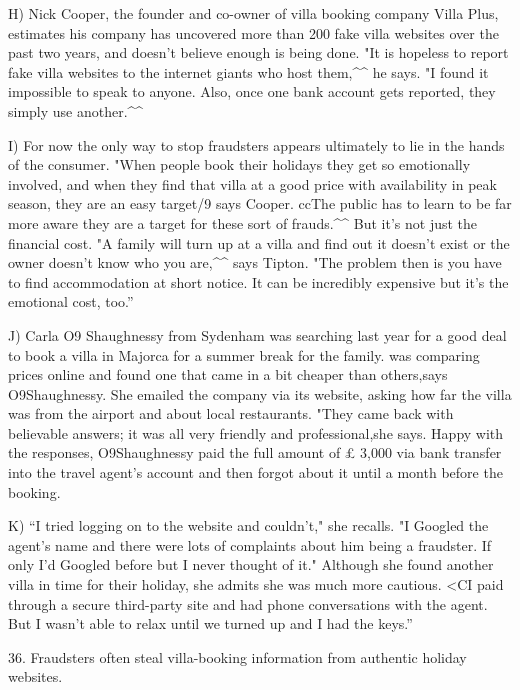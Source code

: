 \documentclass[UTF8,11pt]{ctexart}
\begin{document}
H) Nick Cooper, the founder and co-owner of villa booking company Villa Plus, estimates his company has uncovered more than 200 fake villa websites over the past two years, and doesn't believe enough is being done. "It is hopeless to report fake villa websites to the internet giants who host them,\textasciicircum{}\textasciicircum{} he says. "I found it impossible to speak to anyone. Also, once one bank account gets reported, they simply use another.\textasciicircum{}\textasciicircum{}


I) For now the only way to stop fraudsters appears ultimately to lie in the hands of the consumer. "When people book their holidays they get so emotionally involved, and when they find that villa at a good price with availability in peak season, they are an easy target/9 says Cooper. ccThe public has to learn to be far more aware they are a target for these sort of frauds.\textasciicircum{}\textasciicircum{} But it's not just the financial cost. "A family will turn up at a villa and find out it doesn't exist or the owner doesn't know who you are,\textasciicircum{}\textasciicircum{} says Tipton. "The problem then is you have to find accommodation at short notice. It can be incredibly expensive but it's the emotional cost, too.”


J) Carla O9 Shaughnessy from Sydenham was searching last year for a good deal to book a villa in Majorca for a summer break for the family. was comparing prices online and found one that came in a bit cheaper than others,says O9Shaughnessy. She emailed the company via its website, asking how far the villa was from the airport and about local restaurants. "They came back with believable answers; it was all very friendly and professional,she says. Happy with the responses, O9Shaughnessy paid the full amount of £ 3,000 via bank transfer into the travel agent's account and then forgot about it until a month before the booking.


K) “I tried logging on to the website and couldn't," she recalls. "I Googled the agent's name and there were lots of complaints about him being a fraudster. If only I'd Googled before but I never thought of it." Although she found another villa in time for their holiday, she admits she was much more cautious. <CI paid through a secure third-party site and had phone conversations with the agent. But I wasn't able to relax until we turned up and I had the keys.”


36. Fraudsters often steal villa-booking information from authentic holiday websites.
\end{document}
